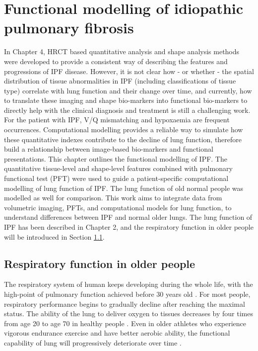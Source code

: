 \chapter{Functional modelling of idiopathic pulmonary fibrosis}\label{Yuwen_ModelBasedAnalysis}
In Chapter 4, HRCT based quantitative analysis and shape analysis methods were developed to provide a consistent way of describing the features and progressions of IPF disease. However, it is not clear how - or whether - the spatial distribution of tissue abnormalities in IPF (including classifications of tissue type) correlate with lung function and their change over time, and currently, how to translate these imaging and shape bio-markers into functional bio-markers to directly help with the clinical diagnosis and treatment is still a challenging work. For the patient with IPF, V/Q mismatching and hypoxaemia are frequent occurrences. Computational modelling provides a reliable way to simulate how these quantitative indexes contribute to the decline of lung function, therefore build a relationship between image-based bio-markers and functional presentations. This chapter outlines the functional modelling of IPF. The quantitative tissue-level and shape-level features combined with pulmonary functional test (PFT) were used to guide a patient-specific computational modelling of lung function of IPF. The lung function of old normal people was modelled as well for comparison. This work aims to integrate data from volumetric imaging, PFTs, and computational models for lung function, to understand differences between IPF and normal older lungs. The lung function of IPF has been described in Chapter 2, and the respiratory function in older people will be introduced in Section \ref{OlderRespiratory}.

\section{Respiratory function in older people} \label{OlderRespiratory}
The respiratory system of human keeps developing during the whole life, with the high-point of pulmonary function achieved before 30 years old \citep{janssens1999physiological,sprung2006age}. For most people, respiratory performance begins to gradually decline after reaching the maximal status. The ability of the lung to deliver oxygen to tissues decreases by four times from age 20 to age 70 in healthy people \citep{smith1986respiratory,zaugg2000respiratory}. Even in older athletes who experience vigorous endurance exercise and have better aerobic ability, the functional capability of lung will progressively deteriorate over time \citep{mittman1965relationship, pollock1997twenty, mcclaran1995longitudinal}. 


